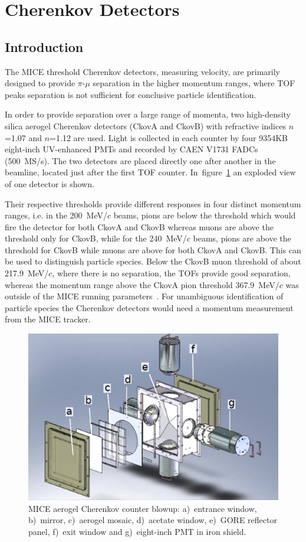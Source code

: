 \graphicspath{{03-Ckov/Figures/}}

\section{Cherenkov Detectors}
\label{Sect:Ckov}

\subsection{Introduction}
\label{SubSect:Ckov_Intro}

The MICE threshold Cherenkov detectors, measuring velocity, are primarily designed to provide $\pi$-$\mu$ separation in the higher momentum ranges, where TOF peaks separation is not sufficient for conclusive particle identification.

In order to provide separation over a large range of momenta, two high-density silica aerogel Cherenkov detectors (CkovA and CkovB) with refractive indices $n$=1.07 and $n$=1.12 are used.
Light is collected in each counter by four 9354KB eight-inch UV-enhanced PMTs and recorded by CAEN V1731 FADCs (500~MS/s).
The two detectors are placed directly one after another in the beamline, located just after the first TOF counter. In~figure~\ref{fig:ckov1} an exploded view of one detector is shown.

Their respective thresholds provide different responses in four distinct momentum ranges, i.e. in the 200~MeV/$c$ beams, pions are below the threshold which would fire the detector for both CkovA and CkovB whereas muons are above the threshold only for CkovB, while for the 240~MeV/$c$ beams, pions are above the threshold for CkovB while muons are above for both CkovA and CkovB.
This can be used to distinguish particle species.
Below the CkovB muon threshold of about 217.9~MeV/$c$, where there is no separation, the TOFs provide good separation, whereas the momentum range above the CkovA pion threshold 367.9~MeV/$c$ was outside of the MICE running parameters~\cite{NOTE473}.
For unambiguous identification of particle species the Cherenkov detectors would need a momentum measurement from the MICE tracker.

\begin{figure}[htb!]
  \begin{center}
    \includegraphics[width=0.6\columnwidth]{./03-Ckov/Figures/Ckov_fix.png}
    \caption{MICE aerogel Cherenkov counter blowup: a)~entrance window, b)~mirror, c)~aerogel mosaic, d)~acetate window, e)~GORE reflector panel, f)~exit window and g)~eight-inch PMT in iron shield.}
    \label{fig:ckov1}
  \end{center}
\end{figure}

